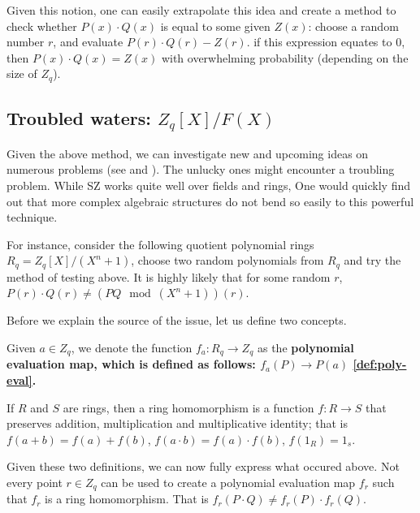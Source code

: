 Given this notion, one can easily extrapolate this idea and create a method 
to check whether $P(x)\cdot Q(x)$ is equal to some given $Z(x)$: 
choose a random number $r$, and evaluate $P(r)\cdot Q(r) - Z(r)$.
if this expression equates to $0$, then $P(x)\cdot Q(x)=Z(x)$ with overwhelming 
probability (depending on the size of $Z_q$).

\subsection{Troubled waters: $Z_q[X]/F(X)$}
Given the above method, we can investigate new and upcoming ideas on numerous
problems (see  \cite{sz-usage2} and ).
The unlucky ones might encounter a troubling problem.
While SZ works quite well over fields and rings,
One would quickly find out that more complex algebraic structures do not 
bend so easily to this powerful technique.

For instance, consider the following quotient polynomial rings $R_q=Z_q[X]/(X^n+1)$,
choose two random polynomials from $R_q$ and try the method of testing above.
It is highly likely that for some random $r$, $P(r)\cdot Q(r) \ne (PQ \mod (X^n+1))(r)$.

Before we explain the source of the issue, let us define two concepts.
\begin{defn}
  Given $a\in Z_q$, we denote the function $f_a: R_q \to Z_q$ as the \bf{polynomial evaluation map},
  which is defined as follows: $f_a(P)\to P(a)$ \autoref{def:poly-eval}.
\end{defn}

\begin{defn}
  If $R$ and $S$ are rings, then a ring homomorphism is a function $f:R \to S$
that preserves addition, multiplication and multiplicative identity; that is
$f(a+b) = f(a)+f(b)$, $f(a\cdot b) = f(a) \cdot f(b)$, $f(1_R)=1_s$. 
\end{defn}

Given these two definitions, we can now fully express what occured above. 
Not every point $r\in Z_q$ can be used to create a polynomial evaluation map $f_r$ such that 
$f_r$ is a ring homomorphism. That is $f_r(P\cdot Q) \ne f_r(P)\cdot f_r(Q)$.


